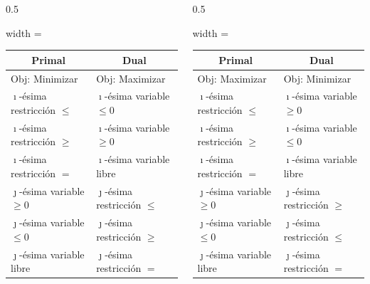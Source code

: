 \documentclass[10pt, aspectratio=169,usenames,dvipsnames]{beamer}
\begin{document}
\begin{frame}{}
    \vspace{2em}
    \begin{columns}
        \begin{column}{0.5\textwidth}
    \begin{adjustbox}{width = \textwidth}
    \begin{tabular}{|l|l|} \hline
        \multicolumn{1}{|c|}{Primal} & \multicolumn{1}{c|}{Dual}  \\ \hline
        Obj: Minimizar & Obj: Maximizar \\ \hline
        $\imath$-ésima restricción $\leq$ & $\imath$-ésima variable $\leq 0$ \\
        $\imath$-ésima restricción $\geq$ & $\imath$-ésima variable $\geq 0$ \\
        $\imath$-ésima restricción $=$ & $\imath$-ésima variable libre \\
        $\jmath$-ésima variable $\geq 0$ & $\jmath$-ésima restricción $\leq$ \\
        $\jmath$-ésima variable $\leq 0$ & $\jmath$-ésima restricción $\geq$ \\
        $\jmath$-ésima variable libre & $\jmath$-ésima restricción $=$ \\ \hline
    \end{tabular}
    \end{adjustbox}
    \end{column}
    \begin{column}{0.5\textwidth}
    \begin{adjustbox}{width = \textwidth}
    \begin{tabular}{|l|l|} \hline
        \multicolumn{1}{|c|}{Primal} & \multicolumn{1}{c|}{Dual}  \\ \hline
        Obj: Maximizar & Obj: Minimizar \\ \hline
        $\imath$-ésima restricción $\leq$ & $\imath$-ésima variable $\geq 0$ \\
        $\imath$-ésima restricción $\geq$ & $\imath$-ésima variable $\leq 0$ \\
        $\imath$-ésima restricción $=$ & $\imath$-ésima variable libre \\
        $\jmath$-ésima variable $\geq 0$ & $\jmath$-ésima restricción $\geq$ \\
        $\jmath$-ésima variable $\leq 0$ & $\jmath$-ésima restricción $\leq$ \\
        $\jmath$-ésima variable libre & $\jmath$-ésima restricción $=$ \\ \hline
    \end{tabular}
    \end{adjustbox}
    \end{column}
    \end{columns}


\end{frame}
\end{document}

